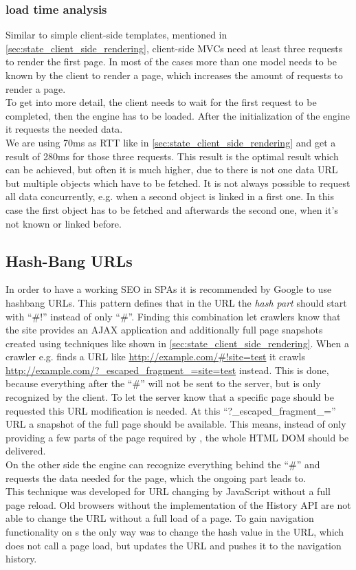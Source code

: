 \subsubsection{load time analysis}
Similar to simple client-side templates, mentioned in \ref{sec:state_client_side_rendering}, client-side MVCs need at least three requests to render the first page.
In most of the cases more than one model needs to be known by the client to render a page, which increases the amount of requests to render a page.
\\
To get into more detail, the client needs to wait for the first request to be completed, then the \ajax{} engine has to be loaded.
After the initialization of the \ajax{} engine it requests the needed data.
\\
We are using 70ms as RTT like in \ref{sec:state_client_side_rendering} and get a result of 280ms for those three requests.
This result is the optimal result which can be achieved, but often it is much higher, due to there is not one data URL but multiple objects which have to be fetched.
It is not always possible to request all data concurrently, e.g. when a second object is linked in a first one.
In this case the first object has to be fetched and afterwards the second one, when it's not known or linked before.

\subsection{Hash-Bang URLs\label{hashbangurls}}
In order to have a working SEO in SPAs it is recommended by Google to use hashbang URLs.
This pattern defines that in the URL the \emph{hash part} should start with \enquote{\#!} instead of only \enquote{\#}.
Finding this combination let crawlers know that the site provides an AJAX application and additionally full page snapshots created using techniques like shown in \ref{sec:state_client_side_rendering}.
When a crawler e.g. finds a URL like \url{http://example.com/\#!site=test} it crawls \newline \url{http://example.com/?\_escaped\_fragment\_=site=test} instead.
This is done, because everything after the \enquote{\#} will not be sent to the server, but is only recognized by the client.
To let the server know that a specific page should be requested this URL modification is needed.
At this \enquote{?\_escaped\_fragment\_=} URL a snapshot of the full page should be available.
This means, instead of only providing a few parts of the page required by \ajax{}, the whole HTML DOM should be delivered.
\\
On the other side the \ajax{} engine can recognize everything behind the \enquote{\#} and requests the data needed for the page, which the ongoing part leads to.
\\
This technique was developed for URL changing by JavaScript without a full page reload.
Old browsers without the implementation of the History API are not able to change the URL without a full load of a page.
To gain navigation functionality on \singlePageApplication{}s the only way was to change the hash value in the URL, which does not call a page load, but updates the URL and pushes it to the navigation history.

